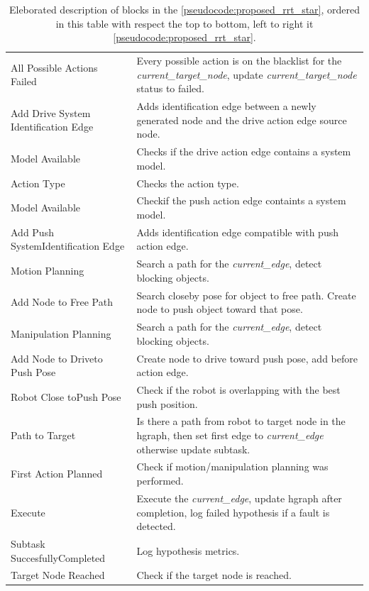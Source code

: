 \begin{table}[H]
\begin{tabular}[t]{>{\raggedright}p{3.5cm}>{\raggedright\arraybackslash}p{10.5cm}}
All Possible Actions Failed & Every possible action is on the blacklist for the \textit{current\_target\_node}, update \textit{current\_target\_node} status to failed.\\
Add Drive System Identification Edge & Adds identification edge between a newly generated node and the drive action edge source node. \\
Model Available& Checks if the drive action edge contains a system model. \\
Action Type& Checks the action type. \\
Model Available& Checkif the push action edge containts a system model. \\
Add Push System\newline Identification Edge& Adds identification edge compatible with push action edge. \\
Motion Planning& Search a path for the \textit{current\_edge}, detect blocking objects. \\
Add Node to Free Path & Search closeby pose for object to free path. Create node to push object toward that pose. \\
Manipulation Planning & Search a path for the \textit{current\_edge}, detect blocking objects.\\
Add Node to Drive\newline to Push Pose& Create node to drive toward push pose, add before action edge. \\
Robot Close to\newline Push Pose & Check if the robot is overlapping with the best push position. \\
Path to Target& Is there a path from robot to target node in the \ac{hgraph}, then set first edge to \textit{current\_edge} otherwise update subtask.\\
First Action Planned&  Check if motion/manipulation planning was performed. \\
Execute& Execute the \textit{current\_edge}, update \ac{hgraph} after completion, log failed hypothesis if a fault is detected. \\
Subtask Succesfully\newline Completed& Log hypothesis metrics. \\
Target Node Reached& Check if the target node is reached.\\
\end{tabular}
\caption{Eleborated description of blocks in the \cref{pseudocode:proposed_rrt_star}, ordered in this table with respect the top to bottom, left to right it \cref{pseudocode:proposed_rrt_star}.}%
\label{table:explainer_hgraph_figures_nodes}
\end{table}

